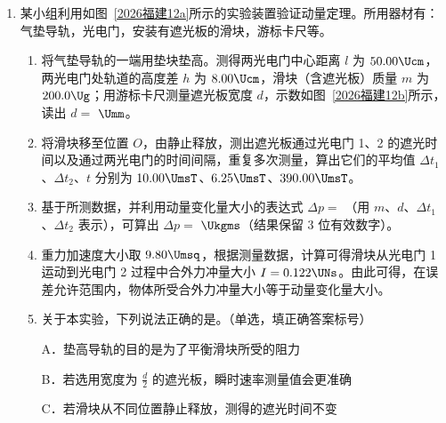 \documentclass[\gkver]{gaokaozhenti}
\begin{document}
\begin{enumerate}
{（2）设加热后气瓶甲、乙内理想气体的压强分别为 $p_1$、$p_2$，温度分别为 $T_1$、$T_2$。根据查理定律，对甲有 $\frac{p_0}{T_0}=\frac{p_1}{T_1}$，对乙有 $\frac{p_0}{T_0}=\frac{p_2}{T_2}$。由题意可知 $p_1-p_2=\rho gh$。因此两气瓶内气体的温度差绝对值 $|T_1-T_2|=\frac{T_0}{p_0}(p_1-p_2)=\frac{\rho ghT_0}{p_0}$。
}

\item
某小组利用如图~\ref{2026福建12a}所示的实验装置验证动量定理。所用器材有：气垫导轨，光电门，安装有遮光板的滑块，游标卡尺等。
\begin{enumerate}
	\item
	将气垫导轨的一端用垫块垫高。测得两光电门中心距离 $l$ 为 $50.00\Ucm$，两光电门处轨道的高度差 $h$ 为 $8.00\Ucm$，滑块（含遮光板）质量 $m$ 为 $200.0\Ug$；用游标卡尺测量遮光板宽度 $d$，示数如图~\ref{2026福建12b}所示，读出 $d=$ $\Umm$。
	\item
	将滑块移至位置 $O$，由静止释放，测出遮光板通过光电门 1、2 的遮光时间以及通过两光电门的时间间隔，重复多次测量，算出它们的平均值 $\Delta t_1$、$\Delta t_2$、$t$ 分别为 $10.00\UmsT$、$6.25\UmsT$、$390.00\UmsT$。
	\item
	基于所测数据，并利用动量变化量大小的表达式 $\Delta p=$ （用 $m$、$d$、$\Delta t_1$、$\Delta t_2$ 表示），可算出 $\Delta p=$ $\Ukgms$（结果保留 3 位有效数字）。
	\item
	重力加速度大小取 $9.80\Umsq$，根据测量数据，计算可得滑块从光电门 1 运动到光电门 2 过程中合外力冲量大小 $I=0.122\UNs$。由此可得，在误差允许范围内，物体所受合外力冲量大小等于动量变化量大小。
	\item
	关于本实验，下列说法正确的是。（单选，填正确答案标号）

	A．垫高导轨的目的是为了平衡滑块所受的阻力

	B．若选用宽度为 $\frac{d}{2}$ 的遮光板，瞬时速率测量值会更准确

	C．若滑块从不同位置静止释放，测得的遮光时间不变
\end{enumerate}
\twopicture[labelA=2026福建12a, labelB=2026福建12b, wA=6.9cm, wB=7.1cm]
{}{}
\end{enumerate}
\end{document}

